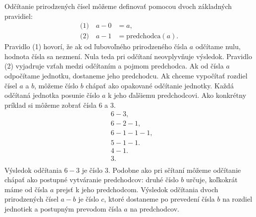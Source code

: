 \documentclass{article}
\begin{document}
Odčítanie prirodzených čísel môžeme definovať pomocou dvoch základných pravidiel:
\[
\begin{aligned}
  \text{(1)}\quad a - 0 &= a, \\
  \text{(2)}\quad a - 1 &= \text{predchodca}(a).
\end{aligned}
\]
Pravidlo (1) hovorí, že ak od ľubovoľného prirodzeného čísla \(a\) odčítame nulu, hodnota čísla sa nezmení. Nula teda pri odčítaní neovplyvňuje výsledok. Pravidlo (2) vyjadruje vzťah medzi odčítaním a pojmom predchodca. Ak od čísla \(a\) odpočítame jednotku, dostaneme jeho predchodcu. Ak chceme vypočítať rozdiel čísel \(a\) a \(b\), môžeme číslo \(b\) chápať ako opakované odčítanie jednotky. Každá odčítaná jednotka posunie číslo \(a\) k jeho ďalšiemu predchodcovi. Ako konkrétny príklad si môžeme zobrať čísla \(6\) a \(3\).
\[
\begin{aligned}
  &6 - 3, \\
  &6 - 2 - 1, \\
  &6 - 1 - 1 - 1, \\
  &5 - 1 - 1. \\
  &4 - 1. \\
  &3. \\
\end{aligned}
\]
Výsledok odčítania \(6 - 3\) je číslo \(3\). Podobne ako pri sčítaní môžeme odčítanie chápať ako postupné vytváranie predchodcov: druhé číslo \(b\) určuje, koľkokrát máme od čísla \(a\) prejsť k jeho predchodcom. Výsledok odčítania dvoch prirodzených čísel \(a - b\) je číslo \(c\), ktoré dostaneme po prevedení čísla \(b\) na rozdiel jednotiek a postupným prevodom čísla \(a\) na predchodcov.
\end{document}
